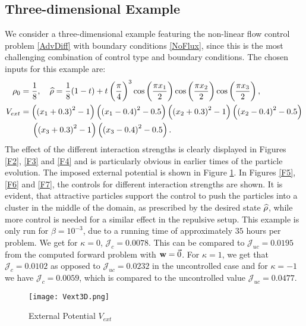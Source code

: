 \subsection{Three-dimensional Example}
We consider a three-dimensional example featuring the non-linear flow control problem \eqref{AdvDiff} with boundary conditions \eqref{NoFlux}, since this is the most challenging combination of control type and boundary conditions.
The chosen inputs for this example are:
\begin{align*}
	\rho_0 &= \frac{1}{8}, \quad \widehat \rho = \frac{1}{8}(1-t) + t\left(\frac{\pi}{4}\right)^3\cos\left(\frac{\pi x_1}{2}\right)\cos\left(\frac{\pi x_2}{2}\right)\cos\left(\frac{\pi x_3}{2}\right),\\
	V_{ext} &= \left(\left(x_1 + 0.3\right)^2 - 1\right)\left(\left(x_1 - 0.4\right)^2 - 0.5\right) \left(\left(x_2 + 0.3\right)^2 - 1\right)\left(\left(x_2 - 0.4\right)^2 - 0.5\right)\\
	&\ \quad\left(\left(x_3 + 0.3\right)^2 - 1\right)\left(\left(x_3 - 0.4\right)^2 - 0.5\right).
\end{align*}
The effect of the different interaction strengths is clearly displayed in Figures \ref{F2}, \ref{F3} and \ref{F4} and is particularly obvious in earlier times of the particle evolution.
The imposed external potential is shown in Figure \ref{F1}.
In Figures \ref{F5}, \ref{F6} and \ref{F7}, the controls for different interaction strengths are shown. It is evident, that attractive particles support the control to push the particles into a cluster in the middle of the domain, as prescribed by the desired state $\widehat \rho$, while more control is needed for a similar effect in the repulsive setup.
This example is only run for $\beta = 10^{-3}$, due to a running time of approximately $35$ hours per problem. We get for $\kappa = 0$, $\mathcal J_c = 0.0078$. This can be compared to $\mathcal J_{uc} = 0.0195$ from the computed forward problem with $\mathbf{w} = \vec 0$. For $\kappa = 1$, we get that $\mathcal J_c = 0.0102$ as opposed to $\mathcal J_{uc} = 0.0232$ in the uncontrolled case and for $\kappa = -1$ we have $\mathcal J_c = 0.0059$, which is compared to the uncontrolled value $\mathcal J_{uc} = 0.0477$.


	\begin{figure}[h]
		\centering
		\texttt{[image: Vext3D.png]}
		\caption{External Potential $V_{ext}$} 
		\label{F1}
	\end{figure}

	

